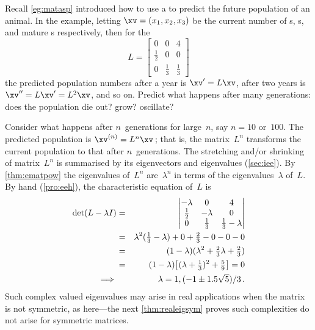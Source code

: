 \begin{example} \label{eg:ltas}
Recall \autoref{eg:matasp} introduced how to use a  to predict the future population of an animal.
In the example, letting \(\xv=(x_1,x_2,x_3)\) be the current number of s, s, and mature s respectively, then for the 
\begin{equation*}
L=\begin{bmatrix} 0&0&4\\\frac12&0&0\\0&\frac13&\frac13 \end{bmatrix}
\end{equation*} 
the predicted population numbers after a year is \(\xv'=L\xv\), after two years is \(\xv''=L\xv'=L^2\xv\), and so on.
Predict what happens after many generations: does the population die out? grow? oscillate? 
\begin{solution} 
Consider what happens after \(n\)~generations for large~\(n\), say \(n=10\) or~\(100\).
The predicted population is \(\xv^{(n)}=L^n\xv\)\,; that is, the matrix~\(L^n\) transforms the current population to that after \(n\)~generations.
The stretching and/or shrinking of matrix~\(L^n\) is summarised by its eigenvectors and eigenvalues (\autoref{sec:iee}).
By \autoref{thm:ematpow} the eigenvalues of~\(L^n\) are~\(\lambda^n\) in terms of the eigenvalues~\(\lambda\) of~\(L\).
By hand (\autoref{pro:eeh}), the characteristic equation of~\(L\) is
\begin{eqnarray*}
\det(L-\lambda I)
&=&\begin{vmatrix} -\lambda&0&4\\\frac12&-\lambda&0\\0&\frac13&\frac13-\lambda \end{vmatrix}
\\&=&\lambda^2(\tfrac13-\lambda)+0+\tfrac23-0-0-0
\\&=&(1-\lambda)(\lambda^2 +\tfrac23\lambda+\tfrac23)
\\&=&(1-\lambda)\big[(\lambda+\tfrac13)^2+\tfrac59\big]=0
\\\implies&&\lambda=1,(-1\pm 1.5\sqrt5)/3\,.
\end{eqnarray*}
Such complex valued eigenvalues may arise in real applications when the matrix is not symmetric, as here---the next \autoref{thm:realeigsym} proves such complexities do not arise for symmetric matrices.


\end{solution}
\end{example}
